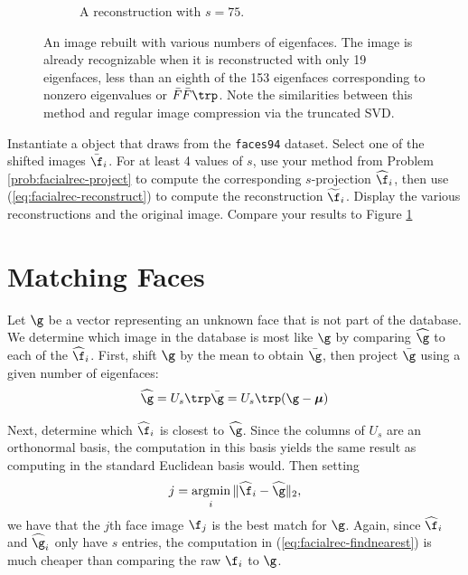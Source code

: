 \begin{figure}[H]
\begin{subfigure}{0.32\textwidth}
    \caption{A reconstruction with $s=75$.}
\end{subfigure}
\caption{An image rebuilt with various numbers of eigenfaces. The image is already recognizable when it is reconstructed with only 19 eigenfaces, less than an eighth of the 153 eigenfaces corresponding to nonzero eigenvalues or $\bar{F}\bar{F}\trp$.
Note the similarities between this method and regular image compression via the truncated SVD.}
\label{fig:rebuiltImage}
\end{figure}

\begin{problem}
Instantiate a  object that draws from the \texttt{faces94} dataset.
Select one of the shifted images $\bar{\f}_i$.
For at least 4 values of $s$, use your method from Problem \ref{prob:facialrec-project} to compute the corresponding $s$-projection $\widehat{\f}_i$, then use (\ref{eq:facialrec-reconstruct}) to compute the reconstruction $\widetilde{\f}_i$.
Display the various reconstructions and the original image.
Compare your results to Figure \ref{fig:rebuiltImage}
\end{problem}

\section*{Matching Faces} %

Let $\g$ be a vector representing an unknown face that is not part of the database.
We determine which image in the database is most like $\g$ by comparing $\widehat{\g}$ to each of the $\widehat{\f}_i$.
First, shift $\g$ by the mean to obtain $\bar{\g}$, then project $\bar{\g}$ using a given number of eigenfaces:
\begin{equation}
    \widehat{\g} = U_s\trp\bar{\g} = U_s\trp(\g - \boldsymbol{\mu})
    \label{eq:facialrec-unknownface}
\end{equation}

Next, determine which $\widehat{\f}_i$ is closest to $\widehat{\g}$.
Since the columns of $U_s$ are an orthonormal basis, the computation in this basis yields the same result as computing in the standard Euclidean basis would.
Then setting
\begin{equation}
j = \mathop{{\text{argmin}}\vphantom{\sim}}\limits_{\displaystyle _{i}} \|\widehat{\f}_i - \widehat{\g}\|_2, %
\label{eq:facialrec-findnearest}
\end{equation}
we have that the $j$th face image $\f_j$ is the best match for $\g$.
Again, since $\widehat{\f}_i$ and $\widehat{\g}_i$ only have $s$ entries, the computation in (\ref{eq:facialrec-findnearest}) is much cheaper than comparing the raw $\f_i$ to $\g$.

